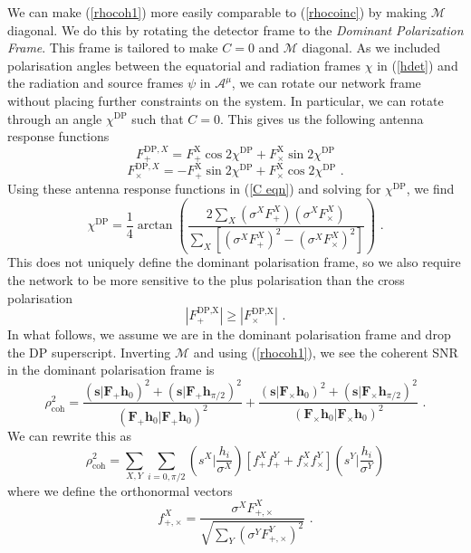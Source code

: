 \documentclass[11pt]{cuthesis}
\newcommand{\fs}{\text{ .}}
\begin{document}
We can make (\ref{rhocoh1}) more easily comparable to (\ref{rhocoinc}) by making $\mathcal{M}$ diagonal. We do this by rotating the detector frame to the \textit{Dominant Polarization Frame}. This frame is tailored to make $C=0$ and $\mathcal{M}$ diagonal. As we included polarisation angles between the equatorial and radiation frames $\chi$ in (\ref{hdet}) and the radiation and source frames $\psi$ in $\mathcal{A}^\mu$, we can rotate our network frame without placing further constraints on the system. In particular, we can rotate through an angle $\chi^\text{DP}$ such that $C=0$. This gives us the following antenna response functions 
\begin{equation}
F_+^{\text{DP},X} = F_+^\text{X} \cos 2\chi^\text{DP} + F^\text{X}_\times \sin 2\chi^\text{DP}
\end{equation}
\begin{equation}
F_\times^{\text{DP},X} = -F_+^\text{X} \sin 2\chi^\text{DP} + F^\text{X}_\times \cos 2\chi^\text{DP} \fs
\end{equation}
Using these antenna response functions in (\ref{C eqn}) and solving for $\chi^\text{DP}$, we find
\begin{equation}
\chi^\text{DP} = \frac{1}{4} \arctan \left( \frac{2\sum_X (\sigma^X F^X_+)(\sigma^X F^X_\times)}{\sum_X \left[ (\sigma^X F^X_+)^2 - (\sigma^X F^X_\times)^2 \right] }  \right) \fs
\end{equation}
This does not uniquely define the dominant polarisation frame, so we also require the network to be more sensitive to the plus polarisation than the cross polarisation
\begin{equation}
|F^\text{DP,X}_+ | \geq | F^\text{DP,X}_\times | \fs
\end{equation}
In what follows, we assume we are in the dominant polarisation frame and drop the DP superscript. Inverting $\mathcal{M}$ and using (\ref{rhocoh1}), we see the coherent SNR in the dominant polarisation frame is
\begin{equation} \label{rhocoh dof}
\rho_\text{coh}^2 = \frac{(\textbf{s}|\textbf{F}_+ \textbf{h}_0)^2 + (\textbf{s}|\textbf{F}_+ \textbf{h}_{\pi/2})^2}{(\textbf{F}_+\textbf{h}_0|\textbf{F}_+\textbf{h}_0)^2} + \frac{(\textbf{s}|\textbf{F}_\times \textbf{h}_0)^2 + (\textbf{s}|\textbf{F}_\times \textbf{h}_{\pi/2})^2}{(\textbf{F}_\times\textbf{h}_0|\textbf{F}_\times\textbf{h}_0)^2} \fs
\end{equation}
We can rewrite this as
\begin{equation} \label{rhocoh}
\rho_\text{coh}^2 = \sum_{X,Y} \sum_{i=0,\pi/2} \left( s^X \bigg| \frac{h_i}{\sigma^X} \right) [f_+^X f_+^Y + f_\times^X f_\times^Y]  \left( s^Y \bigg| \frac{h_i}{\sigma^Y} \right)
\end{equation}
where we define the orthonormal vectors
\begin{equation}
f^X_{+,\times} = \frac{\sigma^X F^X_{+,\times}}{\sqrt{\sum_Y( \sigma^Y F^Y_{+,\times})^2}} \textbf{ .}
\end{equation}
\end{document}
